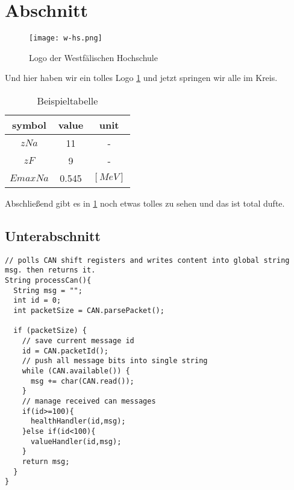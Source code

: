 \section{Abschnitt}\label{sec:first}

\begin{figure}[!ht]
    \centering
    \texttt{[image: w-hs.png]}
    \captionsetup{width=1.0\linewidth}
    \caption[Logo der Westfälischen Hochschule]{Logo der Westfälischen Hochschule \parencite{whs}}
    \label{fig:w-hs} %
\end{figure}

\noindent Und hier haben wir ein tolles Logo \cref{fig:w-hs} und jetzt springen wir alle im Kreis.

\begin{table}[!ht]
\centering
    \begin{tabular}{ | c | c | c | }
        \hline
        symbol & value & unit \\ \hline            
        $z Na$ & 11 & - \\ \hline      
        $z F$ & 9 & - \\ \hline      
        $Emax Na$ & 0.545 & $[MeV]$ \\ \hline
    \end{tabular}
    \caption{Beispieltabelle}
    \label{tab:example} %
\end{table}

\noindent Abschließend gibt es in \cref{tab:example} noch etwas tolles zu sehen und das ist total dufte.

\subsection{Unterabschnitt}\label{subsec:first}

\begin{lstlisting}[caption = C++ Quellcodebeispiel, captionpos = b, label = lst:example]
// polls CAN shift registers and writes content into global string msg. then returns it.
String processCan(){                
  String msg = "";
  int id = 0;
  int packetSize = CAN.parsePacket();

  if (packetSize) {
    // save current message id
    id = CAN.packetId(); 
    // push all message bits into single string
    while (CAN.available()) {       
      msg += char(CAN.read());
    }
    // manage received can messages
    if(id>=100){                    
      healthHandler(id,msg);
    }else if(id<100){
      valueHandler(id,msg);
    } 
    return msg;
  }
}
\end{lstlisting}

